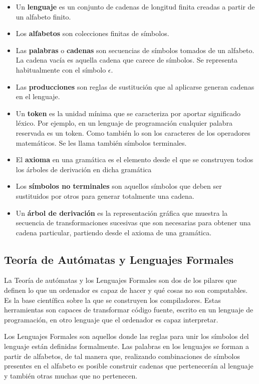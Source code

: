 \begin{itemize}
    \item Un \textbf{lenguaje} es un conjunto de cadenas de longitud finita creadas a partir de un alfabeto finito.
    \item Los \textbf{alfabetos} son colecciones finitas de símbolos.
    \item Las \textbf{palabras} o \textbf{cadenas} son secuencias de símbolos tomados de un alfabeto. La cadena vacía es aquella cadena que carece de símbolos. Se representa habitualmente con el símbolo $\epsilon$.
    \item Las \textbf{producciones} son reglas de sustitución que al aplicarse generan cadenas en el lenguaje.
    \item Un \textbf{token} es la unidad mínima que se caracteriza por aportar significado léxico. Por ejemplo, en un lenguaje de programación cualquier palabra reservada es un token. Como también lo son los caracteres de los operadores matemáticos. Se les llama también símbolos terminales.
    \item El \textbf{axioma} en una gramática es el elemento desde el que se construyen todos los árboles de derivación en dicha gramática
    \item Los \textbf{símbolos no terminales} son aquellos símbolos que deben ser sustituidos por otros para generar totalmente una cadena.
    \item Un \textbf{árbol de derivación} es la representación gráfica que muestra la secuencia de transformaciones sucesivas que son necesarias para obtener una cadena particular, partiendo desde el axioma de una gramática.
\end{itemize}

\subsection{Teoría de Autómatas y Lenguajes Formales}

La Teoría de autómatas y los Lenguajes Formales son dos de los pilares que definen lo que un ordenador es capaz de hacer y qué cosas no son computables. Es la base científica sobre la que se construyen los compiladores. Estas herramientas son capaces de transformar código fuente, escrito en un lenguaje de programación, en otro lenguaje que el ordenador es capaz interpretar.


Los Lenguajes Formales son aquellos donde las reglas para unir los símbolos del lenguaje están definidas formalmente. Las palabras en los lenguajes se forman a partir de alfabetos, de tal manera que, realizando combinaciones de símbolos presentes en el alfabeto es posible construir cadenas que pertenecerán al lenguaje y también otras muchas que no pertenecen. 

